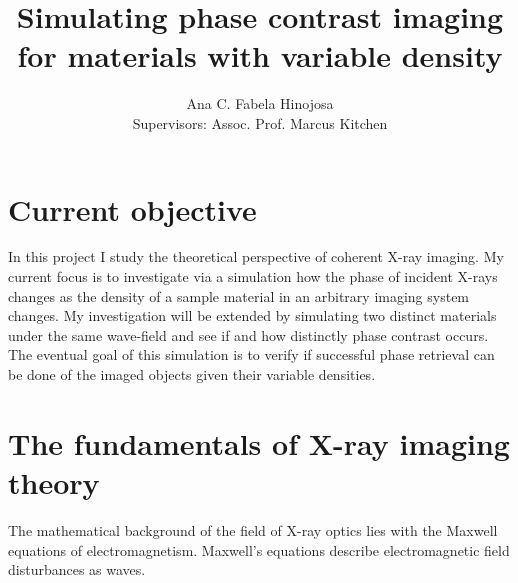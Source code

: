 \documentclass[9pt, a4paper]{article}
\title{Simulating phase contrast imaging for materials with variable density}
\author{Ana C. Fabela Hinojosa \\
\small{Supervisors: Assoc. Prof. Marcus Kitchen}}
\begin{document}
\maketitle
\section{Current objective}
In this project I study the theoretical perspective of coherent X-ray imaging. My current focus is to investigate via a simulation how the phase of incident X-rays changes as the density of a sample material in an arbitrary imaging system changes. My investigation will be extended by simulating two distinct materials under the same wave-field and see if and how distinctly phase contrast occurs. The eventual goal of this simulation is to verify if successful phase retrieval can be done of the imaged objects given their variable densities.

\section{The fundamentals of X-ray imaging theory}
The mathematical background of the field of X-ray optics lies with the Maxwell equations of electromagnetism\cite{PagsTutes}. Maxwell's equations describe electromagnetic field disturbances as waves.
\end{document}
